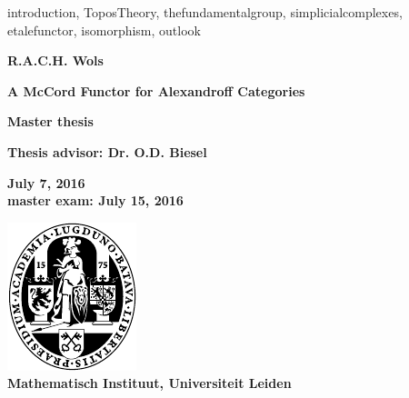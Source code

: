 %
%




{
	introduction,
	ToposTheory,
	thefundamentalgroup,
	simplicialcomplexes,
	etalefunctor,
	isomorphism,
	outlook
}

\makeindex



	\thispagestyle{empty}
	\vspace*{7em}
	\begin{center}
	{\large\bf R.A.C.H. Wols\par} \vspace{3em} {\LARGE\bf A McCord Functor for Alexandroff Categories\par} \vspace{3em} {\large\bf
	Master thesis\par} \vspace{1em} {\large\bf Thesis advisor:
	Dr. O.D. Biesel \par} \vspace{3em} {\large\bf July 7, 2016\\
	master exam: July 15, 2016\par}\vfill
	\includegraphics{ulzegel.pdf}\\
	\vspace{2em}
	{\large\bf Mathematisch Instituut, Universiteit Leiden}
	\end{center}


	\clearpage

	\begin{abstract}
	We shall generalize the construction of McCord's weak homotopy equivalence between the realization of the nerve of a finite poset and the original poset to Alexandroff categories and the induced toposes between them. For this, we shall construct a functor, called the McCord functor, which will give us the basis for a geometric morphism. Finally, we attempt to find sufficient conditions for flatness. The resulting geometric morphism will provide an equivalence of categories on the level of locally constant finite objects.
	\end{abstract}

